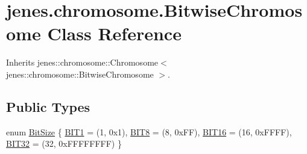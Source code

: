 \hypertarget{classjenes_1_1chromosome_1_1_bitwise_chromosome}{
\section{jenes.chromosome.BitwiseChromosome Class Reference}
\label{classjenes_1_1chromosome_1_1_bitwise_chromosome}
}
Inherits jenes::chromosome::Chromosome$<$ jenes::chromosome::BitwiseChromosome $>$.

\subsection*{Public Types}
\begin{CompactItemize}
\item 
enum \hyperlink{classjenes_1_1chromosome_1_1_bitwise_chromosome_dcebd2053ddb9906f17a29837e6ff04c}{BitSize} \{ \hyperlink{_bitwise_chromosome_8java_dcebd2053ddb9906f17a29837e6ff04c4982bc4d3de52713a035a54a501149f8}{BIT1} = (1, 0x1), 
\hyperlink{_bitwise_chromosome_8java_dcebd2053ddb9906f17a29837e6ff04cf64ab504b0994d78a4d72bba097ffaec}{BIT8} = (8, 0xFF), 
\hyperlink{_bitwise_chromosome_8java_dcebd2053ddb9906f17a29837e6ff04c12b7defe5ace4d6bd26b7c9d0881689d}{BIT16} = (16, 0xFFFF), 
\hyperlink{_bitwise_chromosome_8java_dcebd2053ddb9906f17a29837e6ff04cf738d5c01006c83629e2cd1f04a6889a}{BIT32} = (32, 0xFFFFFFFF)
 \}
\end{CompactItemize}
